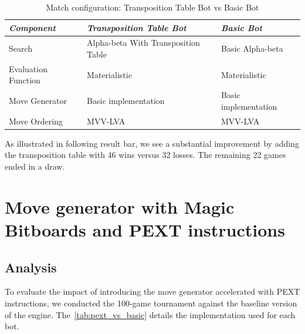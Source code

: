 \begin{table}
    \centering
    \begin{tabular}{|p{4cm}|p{4cm}|p{4cm}|}
    \hline
    \textit{Component}         & \textit{Transposition Table Bot}  & \textit{Basic Bot}     \\ \hline
    Search                     & Alpha-beta With Transposition Table          & Basic Alpha-beta           \\ \hline
    Evaluation Function        & Materialistic                      & Materialistic       \\ \hline
    Move Generator             & Basic implementation              & Basic implementation   \\ \hline
    Move Ordering              & MVV-LVA                           & MVV-LVA                \\ \hline
    \end{tabular}
    \caption{Match configuration: Transposition Table Bot vs Basic Bot}\label{tab:tt_vs_basic}
\end{table}

\noindent As illustrated in following result bar, we see a substantial improvement by adding the transposition table with 46 wins versus 32 losses. The remaining 22 games ended in a draw.

\begin{center}
\medskip
\end{center}

\section{Move generator with Magic Bitboards and PEXT instructions}

\subsection{Analysis}

\noindent To evaluate the impact of introducing the move generator accelerated with PEXT instructions, we conducted the 100-game tournament against the baseline version of the engine. The~\cref{tab:pext_vs_basic} details the implementation used for each bot.

\vspace{1em}

